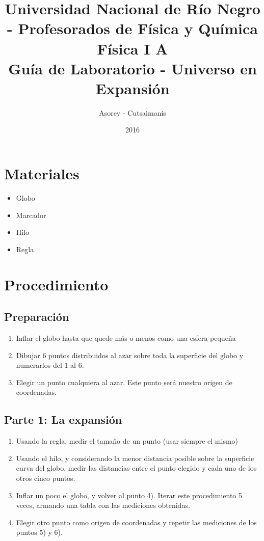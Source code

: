\documentclass[a4paper,12pt]{article}
\begin{document}
\title{
{\normalsize{Universidad Nacional de Río Negro - Profesorados de Física y Química}}\\
Física I A \\ Guía de Laboratorio - Universo en Expansión}
\author{Asorey - Cutsaimanis}
\date{2016}
\maketitle

\section*{Materiales}

\begin{itemize}
	\item Globo
	\item Marcador
	\item Hilo
	\item Regla
\end{itemize}

\section*{Procedimiento}

\subsection*{Preparación}
\begin{enumerate}
	\item Inflar el globo hasta que quede más o menos como una esfera pequeña
	\item Dibujar 6 puntos distribuidos al azar sobre toda la superficie del
		globo y numerarlos del 1 al 6.
	\item Elegir un punto cualquiera al azar. Este punto será nuestro origen de
		coordenadas.
\end{enumerate}

\subsection*{Parte 1: La expansión}
\begin{enumerate}
	\item Usando la regla, medir el tamaño de un punto (usar siempre el mismo)
	\item Usando el hilo, y considerando la menor distancia posible sobre la
		superficie curva del globo, medir las distancias entre el punto elegido
		y cada uno de los otros cinco puntos. 
	\item Inflar un poco el globo, y volver al punto 4). Iterar este
		procedimiento 5 veces, armando una tabla con las mediciones obtenidas.
	\item Elegir otro punto como origen de coordenadas y repetir las mediciones
		de los puntos 5) y 6).
\end{enumerate}
\end{document}
